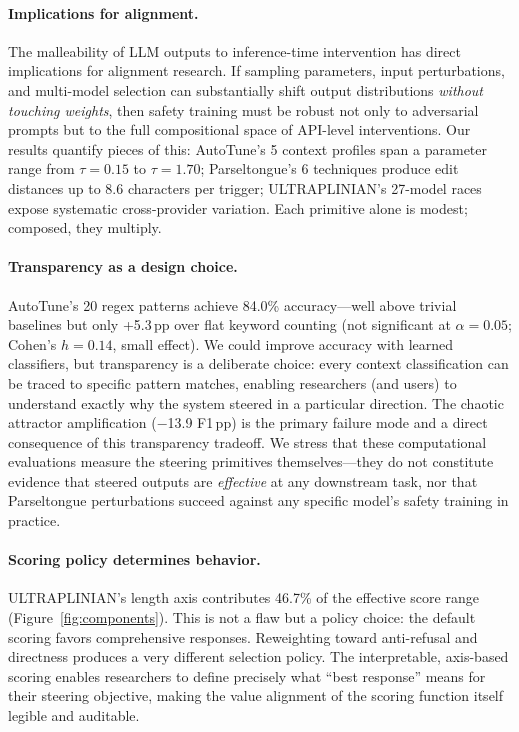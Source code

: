 \documentclass[11pt]{article}
\begin{document}
\paragraph{Implications for alignment.}
The malleability of LLM outputs to inference-time intervention has direct implications for alignment research. If sampling parameters, input perturbations, and multi-model selection can substantially shift output distributions \emph{without touching weights}, then safety training must be robust not only to adversarial prompts but to the full compositional space of API-level interventions. Our results quantify pieces of this: AutoTune's 5 context profiles span a parameter range from $\tau=0.15$ to $\tau=1.70$; Parseltongue's 6 techniques produce edit distances up to 8.6 characters per trigger; ULTRAPLINIAN's 27-model races expose systematic cross-provider variation. Each primitive alone is modest; composed, they multiply.

\paragraph{Transparency as a design choice.}
AutoTune's 20 regex patterns achieve 84.0\% accuracy---well above trivial baselines but only +5.3\,pp over flat keyword counting (not significant at $\alpha=0.05$; Cohen's $h=0.14$, small effect). We could improve accuracy with learned classifiers, but transparency is a deliberate choice: every context classification can be traced to specific pattern matches, enabling researchers (and users) to understand exactly why the system steered in a particular direction. The chaotic attractor amplification ($-$13.9 F1\,pp) is the primary failure mode and a direct consequence of this transparency tradeoff. We stress that these computational evaluations measure the steering primitives themselves---they do not constitute evidence that steered outputs are \emph{effective} at any downstream task, nor that Parseltongue perturbations succeed against any specific model's safety training in practice.

\paragraph{Scoring policy determines behavior.}
ULTRAPLINIAN's length axis contributes 46.7\% of the effective score range (Figure~\ref{fig:components}). This is not a flaw but a policy choice: the default scoring favors comprehensive responses. Reweighting toward anti-refusal and directness produces a very different selection policy. The interpretable, axis-based scoring enables researchers to define precisely what ``best response'' means for their steering objective, making the value alignment of the scoring function itself legible and auditable.
\end{document}
